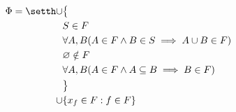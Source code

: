 \message{ !name(compactness.tex)}\documentclass{scrartcl}
\begin{document}
\begin{align*}
    \Phi = \setth \cup &\bigl\{ \\
                          &S\in F \\
                          &\forall A,B (A\in F \wedge B \in S \implies A \cup B \in F ) \\
                          &\varnothing \notin F \\
                          &\forall A,B (A\in F \wedge A \subseteq B \implies B \in F ) \\
                     &\bigr\}\\
    \cup& \{x_f\in F: f\in F\}
  \end{align*}
\end{document}
